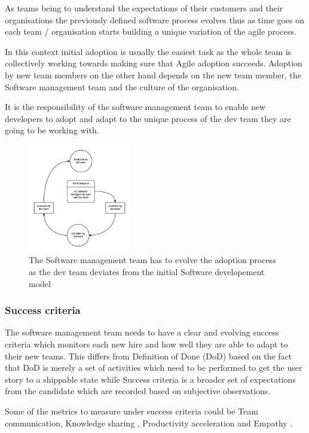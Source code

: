 \documentclass[12pt,conference]{IEEEtran}
\begin{document}
As teams being to understand the expectations of their customers and their organisations the previously defined software process evolves thus as time goes on each team / organisation starts building a unique variation of the agile process.

In this context initial adoption is usually the easiest task as the whole team is collectively working towards making sure that Agile adoption succeeds. Adoption by new team members on the other hand depends on the new team member, the Software management team and the culture of the organisation.

It is the responsibility of the software management team to enable new developers to adopt and adapt to the unique process of the dev team they are going to be working with.

\begin{figure}[t]
\centering
\includegraphics[width=0.4\textwidth]{sm_dev_team_process_evolution.png}
\caption{The Software management team has to evolve the adoption process as the dev team deviates from the initial Software developement model}
\end{figure}



\subsubsection*{Success criteria} The software management team needs to have a clear and evolving success criteria which monitors each new hire and how well they are able to adapt to their new teams. This differs from Definition of Done (DoD) based on the fact that DoD is merely a set of activities which need to be performed to get the user story to a shippable state while Success criteria is a broader set of expectations from the candidate which are recorded based on subjective observations. 

Some of the metrics to measure under success criteria could be Team communication, Knowledge sharing \cite{cabrera_fostering_2005}, Productivity acceleration \cite{grote_making_2011} and Empathy \cite{seppala_hard_2014}.
\end{document}
